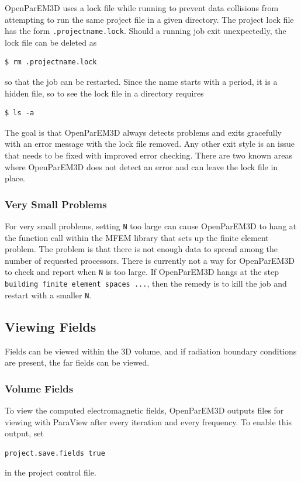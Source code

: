 \documentclass[titlepage]{article}
\renewcommand\_{\textunderscore\linebreak[1]}
\begin{document}
OpenParEM3D uses a lock file while running to prevent data collisions from attempting to run the same project file in a given directory.  The project lock file has the form \texttt{.projectname.lock}.  Should a running job exit unexpectedly, the lock file can be deleted as
\begin{Verbatim}[fontsize=\small]
   $ rm .projectname.lock
\end{Verbatim}
\noindent so that the job can be restarted.  Since the name starts with a period, it is a hidden file, so to see the lock file in a directory requires
\begin{Verbatim}[fontsize=\small]
   $ ls -a
\end{Verbatim}

The goal is that OpenParEM3D always detects problems and exits gracefully with an error message with the lock file removed.  Any other exit style is an issue that needs to be fixed with improved error checking.  There are two known areas where OpenParEM3D does not detect an error and can leave the lock file in place.

\subsubsection{Very Small Problems}

For very small problems, setting \verb+N+ too large can cause OpenParEM3D to hang at the function call within the MFEM library that sets up the finite element problem.  The problem is that there is not enough data to spread among the number of requested processors.  There is currently not a way for OpenParEM3D to check and report when \verb+N+ is too large.  If OpenParEM3D hangs at the step \texttt{building finite element spaces ...}, then the remedy is to kill the job and restart with a smaller \verb+N+.

\subsection{Viewing Fields}

Fields can be viewed within the 3D volume, and if radiation boundary conditions are present, the far fields can be viewed.

\subsubsection{Volume Fields}

To view the computed electromagnetic fields, OpenParEM3D outputs files for viewing with ParaView after every iteration and every frequency.  To enable this output, set
\begin{Verbatim}[fontsize=\small]
  project.save.fields true
\end{Verbatim}
\noindent in the project control file.
\end{document}
